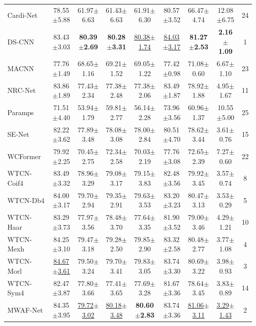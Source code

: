 \begin{table}[H]
\begin{tabular*}{\linewidth}{@{\extracolsep{\fill}}lcccccccc@{}}
Cardi-Net~\cite{Cardi-Net} & 78.55$\pm$5.88 & 61.97$\pm$6.63 & 61.43$\pm$6.63 & 61.91$\pm$6.30 & 80.57$\pm$3.52 & 66.47$\pm$4.74 & 12.08$\pm$6.75 & 24\\
DS-CNN~\cite{DS-CNN} & 83.43$\pm$3.03 & \textbf{80.39$\pm$2.69} & \textbf{80.28$\pm$3.31} & \underline{80.38$\pm$1.74} & \underline{84.03$\pm$3.17} & \textbf{81.27$\pm$2.53} & \textbf{2.16$\pm$1.09} & 1\\
MACNN~\cite{chen2021multi} & 77.76$\pm$1.49 & 68.65$\pm$1.16 & 69.21$\pm$1.52 & 69.05$\pm$1.22 & 77.42$\pm$0.98 & 71.08$\pm$0.60 & 6.67$\pm$1.10 & 23\\
NRC-Net~\cite{NRC-Net} & 83.86$\pm$1.89 & 77.43$\pm$2.34 & 77.38$\pm$2.48 & 77.38$\pm$2.06 & 83.49$\pm$1.87 & 78.92$\pm$1.88 & 4.95$\pm$1.67 & 11\\
Paramps~\cite{Paramps} & 71.51$\pm$4.40 & 53.94$\pm$1.79 & 59.81$\pm$2.77 & 56.14$\pm$2.28 & 73.96$\pm$3.56 & 60.96$\pm$1.37 & 10.55$\pm$5.00 & 25\\
SE-Net~\cite{SE-Net} & 82.22$\pm$3.62 & 77.89$\pm$3.48 & 78.08$\pm$3.08 & 78.00$\pm$2.84 & 80.51$\pm$4.70 & 78.62$\pm$3.44 & 3.61$\pm$0.76 & 15\\
WCFormer~\cite{WCFormer} & 79.92$\pm$2.25 & 70.45$\pm$2.75 & 72.34$\pm$2.58 & 70.03$\pm$2.19 & 77.76$\pm$3.08 & 72.65$\pm$2.39 & 7.27$\pm$0.60 & 22\\
\midrule
WTCN-Coif4 & 83.49$\pm$3.32 & 78.96$\pm$3.29 & 79.08$\pm$3.17 & 79.15$\pm$3.83 & 82.48$\pm$3.56 & 79.92$\pm$3.45 & 3.57$\pm$0.74 & 8\\
WTCN-Db4 & 84.00$\pm$3.17 & 79.70$\pm$2.94 & 79.35$\pm$2.91 & 79.63$\pm$3.53 & 83.20$\pm$3.23 & 80.47$\pm$3.13 & 3.53$\pm$0.29 & 5\\
WTCN-Haar & 83.29$\pm$3.73 & 77.97$\pm$3.56 & 78.48$\pm$3.70 & 77.64$\pm$3.35 & 81.90$\pm$3.52 & 79.00$\pm$3.46 & 4.29$\pm$1.21 & 10\\
WTCN-Mexh & 84.25$\pm$3.10 & 79.47$\pm$3.18 & 79.28$\pm$2.50 & 79.85$\pm$2.90 & 83.32$\pm$2.58 & 80.48$\pm$2.77 & 3.77$\pm$1.08 & 4\\
WTCN-Morl & \underline{84.67$\pm$3.61} & 79.50$\pm$3.24 & 79.70$\pm$3.41 & 79.83$\pm$3.05 & 83.74$\pm$3.30 & 80.69$\pm$3.22 & 3.98$\pm$0.93 & 3\\
WTCN-Sym4 & 82.47$\pm$3.87 & 77.80$\pm$3.66 & 77.41$\pm$3.65 & 77.69$\pm$3.28 & 81.67$\pm$3.36 & 78.64$\pm$3.45 & 3.83$\pm$0.89 & 14\\
\midrule
MWAF-Net & 84.35$\pm$3.95 & \underline{79.72$\pm$3.02} & \underline{80.18$\pm$3.48} & \textbf{80.60$\pm$2.83} & 83.74$\pm$3.36 & \underline{81.06$\pm$3.11} & \underline{3.29$\pm$1.43} & 2\\
\bottomrule\end{tabular*}
\endgroup
{}
\end{table}

